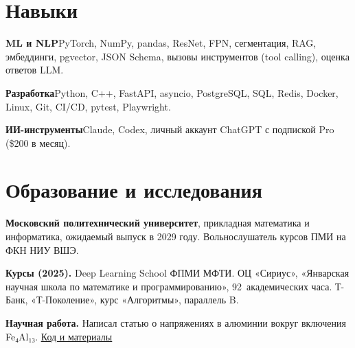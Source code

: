 \documentclass[10pt,a4paper]{article}
\begin{document}
\section{Навыки}
\textbf{ML и NLP}\quad PyTorch, NumPy, pandas, ResNet, FPN, сегментация, RAG, эмбеддинги, pgvector, JSON Schema, вызовы инструментов (tool calling), оценка ответов LLM.\par
\textbf{Разработка}\quad Python, C++, FastAPI, asyncio, PostgreSQL, SQL, Redis, Docker, Linux, Git, CI/CD, pytest, Playwright.\par
\textbf{ИИ-инструменты}\quad Claude, Codex, личный аккаунт ChatGPT с подпиской Pro (\$200 в месяц).

\section{Образование и исследования}
\textbf{Московский политехнический университет}, прикладная математика и информатика, ожидаемый выпуск в 2029 году. Вольнослушатель курсов ПМИ на ФКН НИУ ВШЭ.\par
\textbf{Курсы (2025).} Deep Learning School ФПМИ МФТИ. ОЦ «Сириус», «Январская научная школа по математике и программированию», 92~академических часа. Т-Банк, «Т-Поколение», курс «Алгоритмы», параллель B.\par
\textbf{Научная работа.} Написал статью о напряжениях в алюминии вокруг включения Fe₄Al₁₃. \href{https://github.com/iluuua/magnetostriction-plasticity-bounds}{\underline{Код и материалы}}
\end{document}
